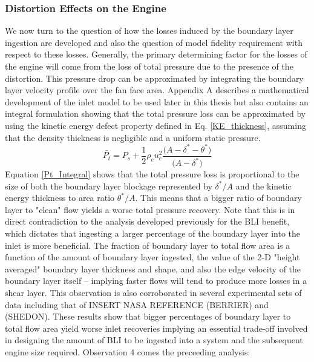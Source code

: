 				\subsubsection{\textbf{Distortion Effects on the Engine}}
					We now turn to the question of how the losses induced by the boundary layer ingestion are developed and also the question of model fidelity requirement with respect to these losses.  Generally, the primary determining factor for the losses of the engine will come from the loss of total pressure due to the presence of the distortion.  This pressure drop can be approximated by integrating the boundary layer velocity profile over the fan face area.  Appendix A describes a mathematical development of the inlet model to be used later in this thesis but also contains an integral formulation showing that the total pressure loss can be approximated by using the kinetic energy defect property defined in Eq. \ref{KE_thickness}, assuming that the density thickness is negligible and a uniform static pressure.  
					\begin{equation}
						\bar{P_t} = P_s + \frac{1}{2}\rho_e u_e^2 \frac{\Big(A-\delta^*-\theta^*\Big)}{\Big(A-\delta^*\Big)} \label{Pt_Integral}
					\end{equation}
					Equation \ref{Pt_Integral} shows that the total pressure loss is proportional to the size of both the boundary layer blockage represented by $\delta^* / A$ and the kinetic energy thickness to area ratio $\theta^* / A$.  This means that a bigger ratio of boundary layer to "clean" flow yields a worse total pressure recovery.  Note that this is in direct contradiction to the analysis developed previously for the BLI benefit, which dictates that ingesting a larger percentage of the boundary layer into the inlet is more beneficial.  The fraction of boundary layer to total flow area is a function of the amount of boundary layer ingested, the value of the 2-D "height averaged" boundary layer thickness and shape, and also the edge velocity of the boundary layer itself -- implying faster flows will tend to produce more losses in a shear layer.  This observation is also corroborated in several experimental sets of data including that of INSERT NASA REFERENCE (BERRIER) and (SHEDON).  These results show that bigger percentages of boundary layer to total flow area yield worse inlet recoveries implying an essential trade-off involved in designing the amount of BLI to be ingested into a system and the subsequent engine size required.  Observation 4 comes the preceeding analysis:
					
